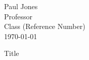 \documentclass[12pt]{article}
\begin{document}
\begin{flushleft} {

Paul Jones\\
Professor   \\
Class (Reference Number) \\
\today \\
\begin{center}
Title
\end{center}

} \end{flushleft}

\setlength{\parindent}{0.5in} 


\clearpage

	

\end{document}
